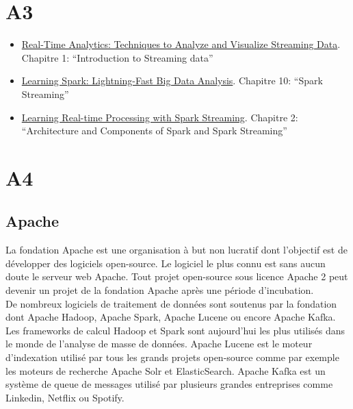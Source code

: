 \section{A3}
  \begin{itemize}
    \item \href{http://www.amazon.fr/Real-Time-Analytics-Techniques-Visualize-Streaming/dp/1118837916/ref=sr_1_7?s=english-books&ie=UTF8&qid=1446301986&sr=1-7&keywords=streaming}{Real-Time Analytics: Techniques to Analyze and Visualize Streaming Data}. Chapitre 1: ``Introduction to Streaming data''
    \item \href{http://www.amazon.com/Learning-Spark-Lightning-Fast-Data-Analysis/dp/1449358624/ref=sr_1_1?ie=UTF8&qid=1446301706&sr=8-1&keywords=apache+spark}{Learning Spark: Lightning-Fast Big Data Analysis}. Chapitre 10: ``Spark Streaming''
    \item \href{http://www.amazon.fr/Learning-Real-time-Processing-Spark-Streaming-ebook/dp/B015Q7I3NM/ref=sr_1_2?s=english-books&ie=UTF8&qid=1446301986&sr=1-2&keywords=streaming}{Learning Real-time Processing with Spark Streaming}. Chapitre 2: ``Architecture and Components of Spark and Spark Streaming''
  \end{itemize}

\section{A4}
  \subsection{Apache}

    La fondation Apache est une organisation à but non lucratif dont l'objectif est de développer des logiciels open-source. Le logiciel le plus connu est sans aucun doute le serveur web Apache. Tout projet open-source sous licence Apache 2 peut devenir un projet de la fondation Apache après une période d'incubation. \\

    De nombreux logiciels de traitement de données sont soutenus par la fondation dont Apache Hadoop, Apache Spark, Apache Lucene ou encore Apache Kafka. Les frameworks de calcul Hadoop et Spark sont aujourd'hui les plus utilisés dans le monde de l'analyse de masse de données. Apache Lucene est le moteur d'indexation utilisé par tous les grands projets open-source comme par exemple les moteurs de recherche Apache Solr et ElasticSearch. Apache Kafka est un système de queue de messages utilisé par plusieurs grandes entreprises comme Linkedin, Netflix ou Spotify.

